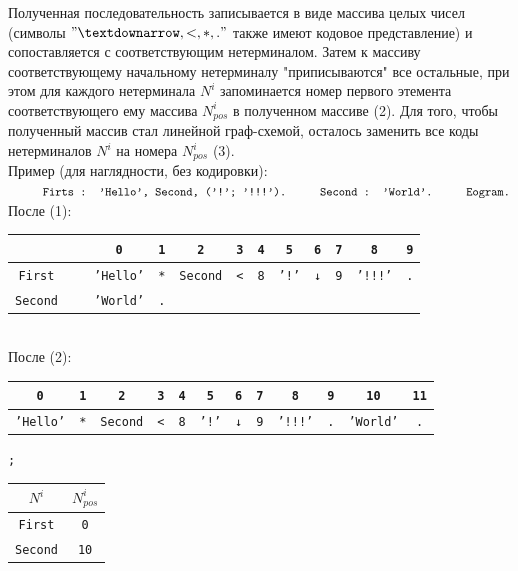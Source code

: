 \documentclass[12pt]{article}
\newcommand\tab[1][1cm]{\hspace*{#1}}
\begin{document}
Полученная последовательность записывается в виде массива целых чисел (символы $" ↓, <, *, ."$ также имеют кодовое представление) и сопоставляется с соответствующим нетерминалом. Затем к массиву соответствующему начальному нетерминалу "приписываются" все остальные, при этом для каждого нетерминала $N^i$ запоминается номер первого этемента соответствующего ему массива $N^i_{pos}$ в полученном массиве (2). Для того, чтобы полученный массив стал линейной граф-схемой, осталось заменить все коды нетерминалов $N^i$ на номера $N^i_{pos}$ (3). \\

Пример (для наглядности, без кодировки):\\
$\tab \texttt{Firts  : 'Hello', Second, ('!'; '!!!').}\\
\tab \texttt{Second : 'World'.}\\
\tab \texttt{Eogram.}
$
\\

После (1):\\
\tab\begin{tabular}{|c|c|c|c|c|c|c|c|c|c|c|c|}
\hline
\ & \ & \texttt{0} & \texttt{1} & \texttt{2} & \texttt{3} & \texttt{4} & \texttt{5} & \texttt{6} & \texttt{7} & \texttt{8} & \texttt{9}\\
\hline
\texttt{First} & \ & \texttt{'Hello'} & \texttt{*} & \texttt{Second} & \texttt{<} & \texttt{8} & \texttt{'!'} & \texttt{↓} & \texttt{9} & \texttt{'!!!'} & \texttt{.}\\
\hline
\texttt{Second} & \ & \texttt{'World'} & \texttt{.} & \ & \ & \ & \ & \ & \ & \ & \ \\
\hline
\end{tabular}
\\

После (2):\\
\tab\begin{tabular}{|c|c|c|c|c|c|c|c|c|c|c|c|}
\hline
\texttt{0} & \texttt{1} & \texttt{2} & \texttt{3} & \texttt{4} & \texttt{5} & \texttt{6} & \texttt{7} & \texttt{8} & \texttt{9} & \texttt{10} & \texttt{11}\\
\hline
\texttt{'Hello'} & \texttt{*} & \texttt{Second} & \texttt{<} & \texttt{8} & \texttt{'!'} & \texttt{↓} & \texttt{9} & \texttt{'!!!'} & \texttt{.} & \texttt{'World'} & \texttt{.}\\
\hline
\end{tabular}\quad \texttt{;} \quad
\begin{tabular}{|c|c|}
\hline
\texttt{$N^i$} & \texttt{$N^i_{pos}$}\\
\hline
\texttt{First} & \texttt{0}\\
\hline
\texttt{Second} & \texttt{10}\\
\hline
\end{tabular}
\\
\end{document}
